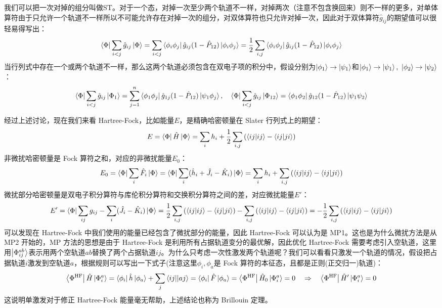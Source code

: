 我们可以把一次对掉的组分叫做ST。对于一个态，对掉一次至少两个轨道不一样，对掉两次（注意不包含换回来）则不一样的更多，对单体算符由于只允许一个轨道不一样所以不可能允许存在对掉一次的组分，对双体算符也只允许对掉一次，因此对于双体算符$\hat{g}_{ij}$的期望值可以很轻易得写出：
\[\bra{\Phi}\sum_{i<j}\hat{g}_{ij}\ket{\Phi}=\sum_{i<j}\bra{\phi_i\phi_j}\hat{g}_{ij}(1-\hat{P}_{12})\ket{\phi_i\phi_j}=\frac{1}{2}\sum_{i,j}\bra{\phi_i\phi_j}\hat{g}_{ij}(1-\hat{P}_{12})\ket{\phi_i\phi_j}\]
当行列式中存在一个或两个轨道不一样，那么这两个轨道必须包含在双电子项的积分中，假设分别为$\ket{\phi_1}\to\ket{\psi_1}$和$\ket{\phi_1}\to\ket{\psi_1}, \ \ket{\phi_2}\to\ket{\psi_2}$：
\[\bra{\Phi}\sum_{i<j}\hat{g}_{ij}\ket{\Phi_1}=\sum_{j=1}^n\bra{\phi_1\phi_j}\hat{g}_{1j}(1-\hat{P}_{12})\ket{\psi_1\phi_j}, \quad \bra{\Phi}\sum_{i<j}\hat{g}_{ij}\ket{\Phi_{12}}=\bra{\phi_1\phi_2}\hat{g}_{12}(1-\hat{P}_{12})\ket{\psi_1\psi_2}\]

经过上述讨论，现在我们来看 Hartree-Fock，比如能量$E$，是精确哈密顿量在 Slater 行列式上的期望：
\[E=\bra{\Phi}\hat{H}\ket{\Phi}=\sum_ih_i+\frac{1}{2}\sum_{i,j}\left(\bra{ij}\ket{ij}-\bra{ij}\ket{ji}\right)\]
非微扰哈密顿量是 Fock 算符之和，对应的非微扰能量$E_0$：
\[E_0=\bra{\Phi}\sum_i\hat{F}_i\ket{\Phi}=\bra{\Phi}\sum_i(\hat{h}_i+\hat{J}_i-\hat{K}_i)\ket{\Phi}=\sum_ih_i+\sum_{i,j}\left(\bra{ij}\ket{ij}-\bra{ij}\ket{ji}\right)\]
微扰部分哈密顿量是双电子积分算符与库伦积分算符和交换积分算符之间的差，对应微扰能量$E'$：
\[E'=\bra{\Phi}\sum_{ij}g_{ij}-\sum_i(\hat{J}_i-\hat{K}_i)\ket{\Phi}=\frac{1}{2}\sum_{i,j}\left(\bra{ij}\ket{ij}-\bra{ij}\ket{ji}\right)-\sum_{i,j}\left(\bra{ij}\ket{ij}-\bra{ij}\ket{ji}\right)=-\frac{1}{2}\sum_{i,j}\left(\bra{ij}\ket{ij}-\bra{ij}\ket{ji}\right)\]
可以发现在 Hartree-Fock 中我们使用的能量已经包含了微扰部分的能量，因此 Hartree-Fock 可以认为是 MP1。这也是为什么微扰方法是从 MP2 开始的，MP 方法的思想是由于 Hartree-Fock 是利用所有占据轨道变分的最优解，因此优化 Hartree-Fock 需要考虑引入空轨道，这里用$\ket{\Phi^{ab}_{ij}}$表示用两个空轨道$ab$替换了两个占据轨道$ij$。为什么只考虑一次性激发两个轨道呢？我们可以看看只激发一个轨道的情况，假设把占据轨道$i$激发到空轨道$a$，根据规则可以写出一下式子(注意这里$\phi_i,\phi_a$是 Fock 算符的本征态，且都是正则(正交归一)轨道)：
\[\bra{\Phi^{\rm{HF}}}\hat{H}\ket{\Phi^a_i}=\bra{\phi_i}\hat{h}\ket{\phi_a}+\sum_j\bra{ij}\ket{|aj}=\bra{\phi_i}\hat{F}\ket{\phi_a}=\bra{\Phi^{\rm{HF}}}\hat{H}_0\ket{\Phi^a_i}=0 \quad \Rightarrow \quad \bra{\Phi^{\rm{HF}}}\hat{H}'\ket{\Phi^a_i}=0\]
这说明单激发对于修正 Hartree-Fock 能量毫无帮助，上述结论也称为 Brillouin 定理。

